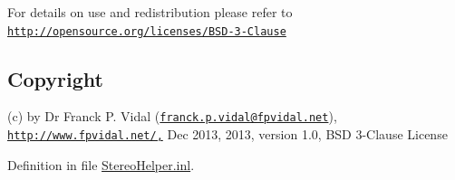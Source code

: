 For details on use and redistribution please refer to \href{http://opensource.org/licenses/BSD-3-Clause}{\tt http://opensource.org/licenses/BSD-\/3-\/Clause}\hypertarget{_x_ray_renderer_8inl_Copyright}{}\subsection{Copyright}\label{_x_ray_renderer_8inl_Copyright}
(c) by Dr Franck P. Vidal (\href{mailto:franck.p.vidal@fpvidal.net}{\tt franck.p.vidal@fpvidal.net}), \href{http://www.fpvidal.net/,}{\tt http://www.fpvidal.net/,} Dec 2013, 2013, version 1.0, BSD 3-\/Clause License 

Definition in file \hyperlink{_stereo_helper_8inl_source}{StereoHelper.inl}.


